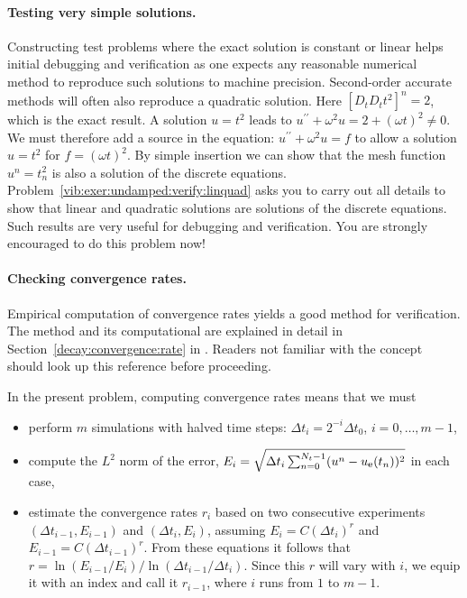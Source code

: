 \documentclass[%
oneside,                 %
final,                   %
10pt]{article}
\begin{document}
\paragraph{Testing very simple solutions.}
Constructing test problems where the exact solution is constant or
linear helps initial debugging and verification as one expects any
reasonable numerical method to reproduce such solutions to machine
precision.  Second-order accurate methods will often also reproduce a
quadratic solution.  Here $[D_tD_tt^2]^n=2$, which is the exact
result. A solution $u=t^2$ leads to $u^{\prime\prime}+\omega^2 u=2 + (\omega
t)^2\neq 0$.  We must therefore add a source in the equation: $u^{\prime\prime} +
\omega^2 u = f$ to allow a solution $u=t^2$ for $f=(\omega t)^2$.  By
simple insertion we can show that the mesh function $u^n = t_n^2$ is
also a solution of the discrete equations.  Problem~\ref{vib:exer:undamped:verify:linquad} asks you to carry out all
details to show that linear and quadratic solutions are solutions
of the discrete equations. Such results are very useful for debugging
and verification. You are strongly encouraged to do this problem now!

\paragraph{Checking convergence rates.}
Empirical computation of convergence rates
yields a good method for verification. The method and its computational
are explained in detail in
Section~\ref{decay:convergence:rate} in
\cite{Langtangen_decay}. Readers not familiar with the concept should
look up this reference before proceeding.

In the present problem, computing convergence rates means that we must

\begin{itemize}
 \item perform $m$ simulations with halved time steps: $\Delta t_i=2^{-i}\Delta t_0$, $i=0,\ldots,m-1$,

 \item compute the $L^2$ norm of the error,
   $E_i=\sqrt{\Delta t_i\sum_{n=0}^{N_t-1}(u^n-\uex(t_n))^2}$ in each case,

 \item estimate the convergence rates $r_i$ based on two consecutive
   experiments $(\Delta t_{i-1}, E_{i-1})$ and $(\Delta t_{i}, E_{i})$,
   assuming $E_i=C(\Delta t_i)^{r}$ and $E_{i-1}=C(\Delta t_{i-1})^{r}$.
   From these equations it follows that
   $r = \ln (E_{i-1}/E_i)/\ln (\Delta t_{i-1}/\Delta t_i)$. Since this $r$
   will vary with $i$, we equip it with an index and call it $r_{i-1}$,
   where $i$ runs from $1$ to $m-1$.
\end{itemize}
\end{document}
